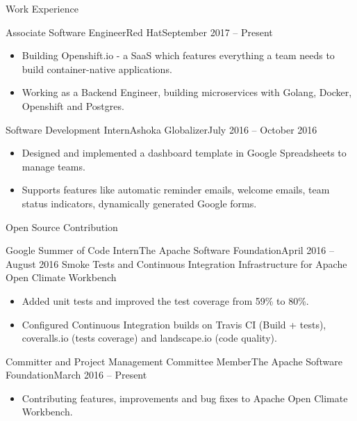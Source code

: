 \documentclass[]{mcdowellcv}
\begin{document}
	\makeheader
	\begin{cvsection}{Work Experience}
		\begin{cvsubsection}{Associate Software Engineer}{Red Hat}{September 2017 -- Present}
			\begin{itemize}
				\item Building Openshift.io - a SaaS which features everything a team needs to build container-native applications.
				\item Working as a Backend Engineer, building microservices with Golang, Docker, Openshift and Postgres.
			\end{itemize}
		\end{cvsubsection}
		\begin{cvsubsection}{Software Development Intern}{Ashoka Globalizer}{July 2016 -- October 2016}
			\begin{itemize}
				\item Designed and implemented a dashboard template in Google Spreadsheets to manage teams.
				\item Supports features like automatic reminder emails, welcome emails, team status indicators, dynamically generated Google forms.
			\end{itemize}
		\end{cvsubsection}
	\end{cvsection}
	\begin{cvsection}{Open Source Contribution}
		\begin{cvsubsection}[2]{Google Summer of Code Intern}{The Apache Software Foundation}{April 2016 -- August 2016}
			Smoke Tests and Continuous Integration Infrastructure for Apache Open Climate Workbench
			\begin{itemize}
				\item Added unit tests and improved the test coverage from 59\% to 80\%.
				\item Configured Continuous Integration builds on Travis CI (Build + tests), coveralls.io (tests coverage) and landscape.io (code quality).
			\end{itemize}
		\end{cvsubsection}
		\begin{cvsubsection}[2]{Committer and Project Management Committee Member}{The Apache Software Foundation}{March 2016 -- Present}
			\begin{itemize}
				\item Contributing features, improvements and bug fixes to Apache Open Climate Workbench.
			\end{itemize}
		\end{cvsubsection}
	\end{cvsection}
\end{document}
